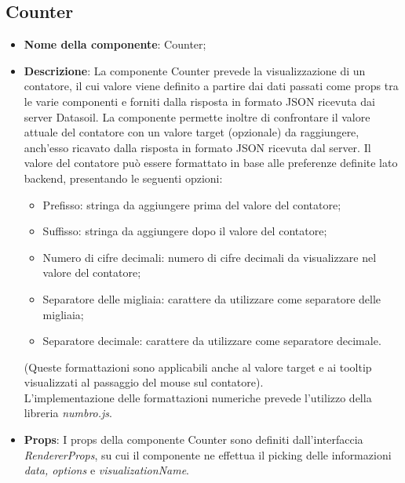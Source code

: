 \subsection{Counter}
\begin{itemize}
      \item \textbf{Nome della componente}: Counter;
      \item \textbf{Descrizione}: La componente Counter prevede la visualizzazione di un contatore, il cui valore viene definito a partire dai dati passati
            come props tra le varie componenti e forniti dalla risposta in formato JSON ricevuta dai server Datasoil. \newline
            La componente permette inoltre di confrontare il valore attuale del contatore con un valore target (opzionale) da raggiungere, anch'esso ricavato
            dalla risposta in formato JSON ricevuta dal server. \newline
            Il valore del contatore può essere formattato in base alle preferenze definite lato backend, presentando le seguenti opzioni:
            \begin{itemize}
                  \label{counter-format}
                  \item Prefisso: stringa da aggiungere prima del valore del contatore;
                  \item Suffisso: stringa da aggiungere dopo il valore del contatore;
                  \item Numero di cifre decimali: numero di cifre decimali da visualizzare nel valore del contatore;
                  \item Separatore delle migliaia: carattere da utilizzare come separatore delle migliaia;
                  \item Separatore decimale: carattere da utilizzare come separatore decimale.
            \end{itemize}
            (Queste formattazioni sono applicabili anche al valore target e ai tooltip visualizzati al passaggio del mouse sul contatore).\\
            L'implementazione delle formattazioni numeriche prevede l'utilizzo della libreria \textit{numbro.js}.
      \item \textbf{Props}: I props della componente Counter sono definiti dall'interfaccia \textit{RendererProps}, su cui il componente ne effettua il picking
            delle informazioni \textit{data, options} e \textit{visualizationName}.
            \begin{listing}[H]

\end{listing}
\end{itemize}
